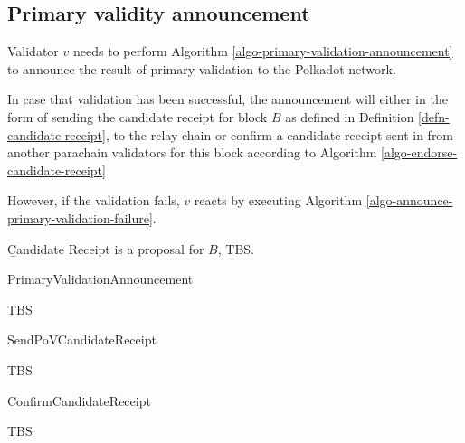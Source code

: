 \subsection{Primary validity announcement}
\label{sect-primary-validaty-announcement}
Validator $v$ needs to perform Algorithm \ref{algo-primary-validation-announcement} to announce the result of primary validation to the Polkadot network.

In case that validation has been successful, the announcement will either in the form of sending the candidate receipt for block $B$ as defined in Definition \ref{defn-candidate-receipt}, to the relay chain or confirm a candidate receipt sent in from another parachain validators for this block according to Algorithm \ref{algo-endorse-candidate-receipt}

However, if the validation fails, $v$ reacts by executing Algorithm \ref{algo-announce-primary-validation-failure}.

\begin{definition}
  \label{defn-candidate-receipt}
        {\b Candidate Receipt} is a proposal for $B$, TBS.
\end{definition}

\begin{algorithm}
  \caption[PrimaryValidationAnnouncement]{\sc PrimaryValidationAnnouncement}
  \label{algo-primary-validation-announcement}
  \begin{algorithmic}[1]
    \Require{}
    
    \State TBS
  \end{algorithmic}
\end{algorithm}

\begin{algorithm}
  \caption[]{\sc SendPoVCandidateReceipt}
  \label{algo-send-candidate-receipt}
  \begin{algorithmic}[1]
    \Require{}
    
    \State TBS
  \end{algorithmic}
\end{algorithm}

\begin{algorithm}
  \caption[]{\sc ConfirmCandidateReceipt}
  \label{algo-endorse-candidate-receipt}
  \begin{algorithmic}[1]
    \Require{}
    
    \State TBS
  \end{algorithmic}
\end{algorithm}

